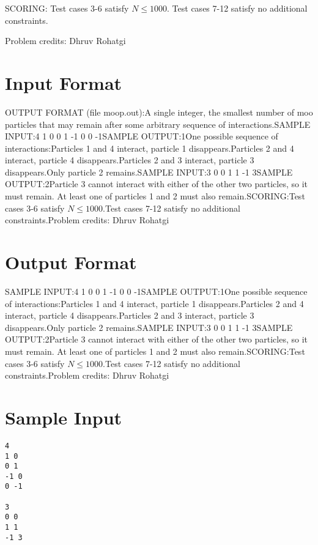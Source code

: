 \documentclass[12pt]{article}
\begin{document}
SCORING:
Test cases 3-6 satisfy $N\le 1000.$ Test cases 7-12 satisfy no additional constraints. 


Problem credits: Dhruv Rohatgi



\section*{Input Format}
OUTPUT FORMAT (file moop.out):A single integer, the smallest number of moo particles that may remain after
some arbitrary sequence of interactions.SAMPLE INPUT:4
1 0
0 1
-1 0
0 -1SAMPLE OUTPUT:1One possible sequence of interactions:Particles 1 and 4 interact, particle 1 disappears.Particles 2 and 4 interact, particle 4 disappears.Particles 2 and 3 interact, particle 3 disappears.Only particle 2 remains.SAMPLE INPUT:3
0 0
1 1
-1 3SAMPLE OUTPUT:2Particle 3 cannot interact with either of the other two particles, so it must
remain. At least one of particles 1 and 2 must also remain.SCORING:Test cases 3-6 satisfy $N\le 1000.$Test cases 7-12 satisfy no additional constraints.Problem credits: Dhruv Rohatgi

\section*{Output Format}
SAMPLE INPUT:4
1 0
0 1
-1 0
0 -1SAMPLE OUTPUT:1One possible sequence of interactions:Particles 1 and 4 interact, particle 1 disappears.Particles 2 and 4 interact, particle 4 disappears.Particles 2 and 3 interact, particle 3 disappears.Only particle 2 remains.SAMPLE INPUT:3
0 0
1 1
-1 3SAMPLE OUTPUT:2Particle 3 cannot interact with either of the other two particles, so it must
remain. At least one of particles 1 and 2 must also remain.SCORING:Test cases 3-6 satisfy $N\le 1000.$Test cases 7-12 satisfy no additional constraints.Problem credits: Dhruv Rohatgi

\section*{Sample Input}
\begin{verbatim}
4
1 0
0 1
-1 0
0 -1

3
0 0
1 1
-1 3
\end{verbatim}
\end{document}
